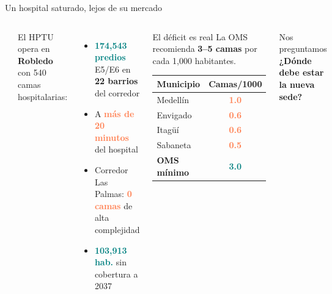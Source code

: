 \documentclass[aspectratio=169, 11pt]{beamer}
\newcommand{\highlight}[1]{\textcolor{teal}{\textbf{#1}}}
\newcommand{\danger}[1]{\textcolor{coral}{\textbf{#1}}}
\begin{document}
{
\begin{frame}{Un hospital saturado, lejos de su mercado}

\begin{columns}[T]
\vspace{2pt}
\begin{center}
\end{center}

\vspace{4pt}
{\small El HPTU opera en \textbf{Robledo} con 540 camas hospitalarias:}

\vspace{3pt}
\begin{itemize}\footnotesize
  \item \highlight{174,543 predios} E5/E6 en \textbf{22 barrios} del corredor
  \item A \danger{más de 20 minutos} del hospital
  \item Corredor Las Palmas: \danger{0 camas} de alta complejidad
  \item \highlight{103,913 hab.} sin cobertura a 2037
\end{itemize}

\begin{alertblock}{\small El déficit es real}
\footnotesize
La OMS recomienda \textbf{3--5 camas} por cada 1,000 habitantes.

\vspace{4pt}
\begin{tabular}{@{}lc@{}}
\toprule
\textbf{Municipio} & \textbf{Camas/1000} \\
\midrule
\rowcolor{coral!10}
Medellín & \danger{1.0} \\
\rowcolor{coral!8}
Envigado & \danger{0.6} \\
Itagüí & \danger{0.6} \\
Sabaneta & \danger{0.5} \\
\midrule
\textbf{OMS mínimo} & \highlight{3.0} \\
\bottomrule
\end{tabular}
\end{alertblock}

\vspace{6pt}
\begin{exampleblock}{\small Nos preguntamos}
\centering\normalsize
\textbf{¿Dónde debe estar\\la nueva sede?}
\end{exampleblock}
\end{columns}
\end{frame}
}
\end{document}
